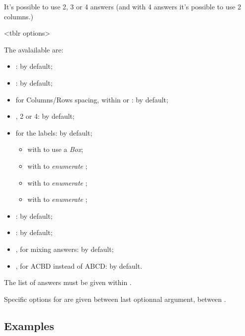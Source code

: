 \documentclass[english,11pt,a4paper]{article}
\begin{document}
\smallskip

It's possible to use 2, 3 or 4 answers (and with 4 answers it's possible to use 2 columns.)

\begin{codehigh}[language=latex/latex3,style/main=teal!25,style/code=teal!25]
<tblr options>
\end{codehigh}

The avalailable  are:

\begin{itemize}
	\item {}:  by default;
	\item {}:  by default;
	\item {} for Columns/Rows spacing, within  or : \MontreCode{6pt/2pt} by default;
	\item {}, 2 or 4:  by default;
	\item {} for the labels:  by default;
	\begin{itemize}
		\item with  to use a \textit{Box};
		\item with  to \textit{enumerate} ;
		\item with  to \textit{enumerate} ;
		\item with  to \textit{enumerate} ;
	\end{itemize}
	\item {}:  by default;
	\item {}:  by default;
	\item {}, for mixing answers:  by default;
	\item {}, for ACBD instead of ABCD:  by default.
\end{itemize}

The list of answers must be given within .

Specific options for  are given between last optionnal argument, between .

\subsection{Examples}
\end{document}
